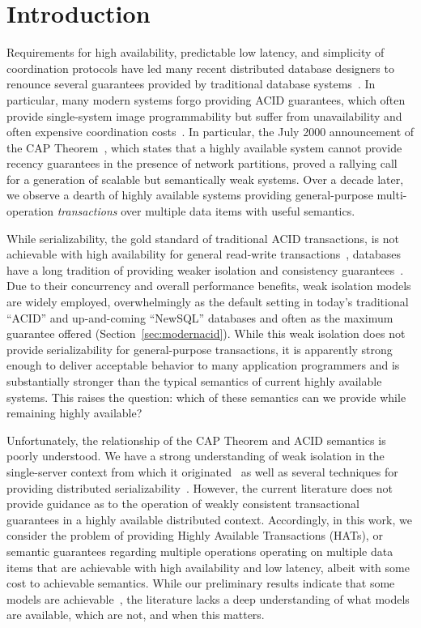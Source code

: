 

\section{Introduction}

Requirements for high availability, predictable low latency, and
simplicity of coordination protocols have led many recent distributed
database designers to renounce several guarantees provided by
traditional database systems~\cite{bigtable, pnuts, dynamo}. In
particular, many modern systems forgo providing ACID guarantees, which
often provide single-system image programmability but suffer from
unavailability and often expensive coordination
costs~\cite{davidson-survey}. In particular, the July 2000
announcement of the CAP Theorem~\cite{gilbert-cap}, which states that
a highly available system cannot provide recency guarantees in the
presence of network partitions, proved a rallying call for a
generation of scalable but semantically weak systems. Over a decade
later, we observe a dearth of highly available systems providing
general-purpose multi-operation \textit{transactions} over multiple
data items with useful semantics.

While serializability, the gold standard of traditional ACID
transactions, is not achievable with high availability for general
read-write transactions~\cite{davidson-survey}, databases have a long
tradition of providing weaker isolation and consistency
guarantees~\cite{adya, ansicritique, gray-isolation}. Due to their
concurrency and overall performance benefits, weak isolation models
are widely employed, overwhelmingly as the default setting in today's
traditional ``ACID'' and up-and-coming ``NewSQL'' databases and often
as the maximum guarantee offered (Section~\ref{sec:modernacid}). While
this weak isolation does not provide serializability for
general-purpose transactions, it is apparently strong enough to
deliver acceptable behavior to many application programmers and is
substantially stronger than the typical semantics of current highly
available systems. This raises the question: which of these semantics
can we provide while remaining highly available?

Unfortunately, the relationship of the CAP Theorem and ACID semantics
is poorly understood. We have a strong understanding of weak isolation
in the single-server context from which it originated~\cite{adya,
  ansicritique, gray-isolation} as well as several techniques for
providing distributed
serializability~\cite{bernstein-concurrency}. However, the current
literature does not provide guidance as to the operation of weakly
consistent transactional guarantees in a highly available distributed
context. Accordingly, in this work, we consider the problem of
providing Highly Available Transactions (HATs), or semantic guarantees
regarding multiple operations operating on multiple data items that
are achievable with high availability and low latency, albeit with
some cost to achievable semantics. While our preliminary results
indicate that some models are achievable~\cite{hat-hotos}, the
literature lacks a deep understanding of what models are available,
which are not, and when this matters.

